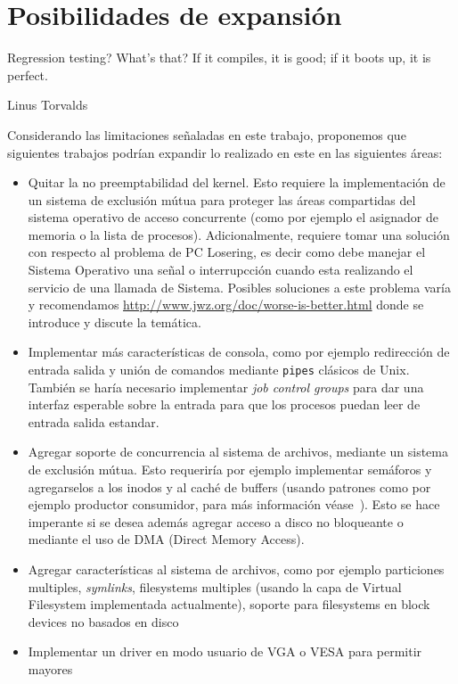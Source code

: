 \section{Posibilidades de expansi\'on}
\label{sec::expansion}

\epigraph{Regression testing? What's that? If it compiles, it is good; if it boots up, it is perfect.}{Linus Torvalds}

Considerando las limitaciones se\~naladas en este trabajo, proponemos
que siguientes trabajos podr\'ian expandir lo realizado en este en las
siguientes \'areas:

\begin{itemize}
	\item Quitar la no preemptabilidad del kernel. Esto requiere la
	implementaci\'on de un sistema de exclusi\'on m\'utua para proteger
	las \'areas compartidas del sistema operativo de acceso concurrente
	(como por ejemplo el asignador de memoria o la lista de procesos).
	Adicionalmente, requiere tomar una soluci\'on con respecto al problema
	de PC Losering, es decir como debe manejar el Sistema Operativo una
	se\~nal o interrupcci\'on cuando esta realizando el servicio de una
	llamada de Sistema. Posibles soluciones a este problema var\'ia y
	recomendamos \url{http://www.jwz.org/doc/worse-is-better.html} donde se
	introduce y discute la tem\'atica.
	\item Implementar m\'as caracter\'isticas de consola, como por ejemplo
	redirecci\'on de entrada salida y uni\'on de comandos mediante \texttt{pipes}
	cl\'asicos de Unix. Tambi\'en se har\'ia necesario implementar \textit{job control
	groups} para dar una interfaz esperable sobre la entrada para que los procesos
	puedan leer de entrada salida estandar.
	\item Agregar soporte de concurrencia al sistema de archivos, mediante un sistema
	de exclusi\'on m\'utua. Esto requerir\'ia por ejemplo implementar sem\'aforos y
	agregarselos a los inodos y al cach\'e de buffers (usando patrones como por ejemplo
	productor consumidor, para m\'as informaci\'on v\'ease~\cite{semaphores}). Esto se
	hace imperante si se desea adem\'as agregar acceso a disco no bloqueante o mediante
	el uso de DMA (Direct Memory Access).
	\item Agregar caracter\'isticas al sistema de archivos, como por ejemplo particiones
	multiples, \textit{symlinks}, filesystems multiples (usando la capa de Virtual Filesystem
	implementada actualmente), soporte para filesystems en block devices no basados en disco
	\item Implementar un driver en modo usuario de VGA o VESA para permitir mayores

\end{itemize}
